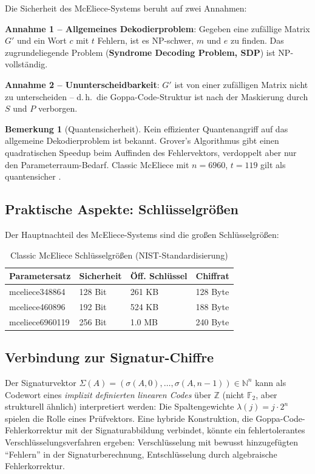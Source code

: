 ﻿\documentclass[a4paper,12pt]{scrreprt}
\theoremstyle{definition}
\newtheorem{bemerkung}{Bemerkung}[section]
\begin{document}
Die Sicherheit des McEliece-Systems beruht auf zwei Annahmen:

\textbf{Annahme 1 -- Allgemeines Dekodierproblem}: Gegeben eine zufällige Matrix $G'$ und ein Wort $c$ mit $t$ Fehlern, ist es NP-schwer, $m$ und $e$ zu finden. Das zugrundeliegende Problem (\textbf{Syndrome Decoding Problem, SDP}) ist NP-vollständig.

\textbf{Annahme 2 -- Ununterscheidbarkeit}: $G'$ ist von einer zufälligen Matrix nicht zu unterscheiden -- d.\,h.\ die Goppa-Code-Struktur ist nach der Maskierung durch $S$ und $P$ verborgen.

\begin{bemerkung}[Quantensicherheit]
Kein effizienter Quantenangriff auf das allgemeine Dekodierproblem ist bekannt. Grover's Algorithmus \cite{Gro96} gibt einen quadratischen Speedup beim Auffinden des Fehlervektors, verdoppelt aber nur den Parameterraum-Bedarf. Classic McEliece mit $n=6960$, $t=119$ gilt als quantensicher \cite{NIST22}.
\end{bemerkung}

\subsection{Praktische Aspekte: Schlüsselgrößen}

Der Hauptnachteil des McEliece-Systems sind die großen Schlüsselgrößen:

\begin{table}[ht]
\centering
\caption{Classic McEliece Schlüsselgrößen (NIST-Standardisierung)}
\begin{tabular}{@{}llll@{}}
\toprule
\textbf{Parametersatz} & \textbf{Sicherheit} & \textbf{Öff. Schlüssel} & \textbf{Chiffrat} \\
\midrule
mceliece348864  & 128 Bit & 261 KB & 128 Byte \\
mceliece460896  & 192 Bit & 524 KB & 188 Byte \\
mceliece6960119 & 256 Bit & 1.0 MB & 240 Byte \\
\bottomrule
\end{tabular}
\end{table}

\subsection{Verbindung zur Signatur-Chiffre}

Der Signaturvektor $\Sigma(A) = (\sigma(A,0),\ldots,\sigma(A,n-1)) \in \mathbb{N}^n$ kann als Codewort eines \emph{implizit definierten linearen Codes} über $\mathbb{Z}$ (nicht $\mathbb{F}_2$, aber strukturell ähnlich) interpretiert werden: Die Spaltengewichte $\lambda(j) = j\cdot 2^n$ spielen die Rolle eines Prüfvektors. Eine hybride Konstruktion, die Goppa-Code-Fehlerkorrektur mit der Signaturabbildung verbindet, könnte ein fehlertolerantes Verschlüsselungsverfahren ergeben: Verschlüsselung mit bewusst hinzugefügten ``Fehlern'' in der Signaturberechnung, Entschlüsselung durch algebraische Fehlerkorrektur.
\end{document}
